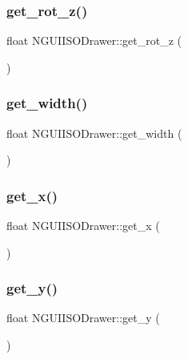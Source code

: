 \subsubsection{\texorpdfstring{get\+\_\+rot\+\_\+z()}{get\_rot\_z()}}
{\footnotesize\ttfamily float N\+G\+U\+I\+I\+S\+O\+Drawer\+::get\+\_\+rot\+\_\+z (\begin{DoxyParamCaption}{ }\end{DoxyParamCaption})}

\hypertarget{class_n_g_u_i_i_s_o_drawer_ae09717ad8caa02443d28f7a5dcaed492}{}\label{class_n_g_u_i_i_s_o_drawer_ae09717ad8caa02443d28f7a5dcaed492} 
\subsubsection{\texorpdfstring{get\+\_\+width()}{get\_width()}}
{\footnotesize\ttfamily float N\+G\+U\+I\+I\+S\+O\+Drawer\+::get\+\_\+width (\begin{DoxyParamCaption}{ }\end{DoxyParamCaption})}

\hypertarget{class_n_g_u_i_i_s_o_drawer_abd25689a8e297fe4d5f2fb865e488b86}{}\label{class_n_g_u_i_i_s_o_drawer_abd25689a8e297fe4d5f2fb865e488b86} 
\subsubsection{\texorpdfstring{get\+\_\+x()}{get\_x()}}
{\footnotesize\ttfamily float N\+G\+U\+I\+I\+S\+O\+Drawer\+::get\+\_\+x (\begin{DoxyParamCaption}{ }\end{DoxyParamCaption})}

\hypertarget{class_n_g_u_i_i_s_o_drawer_a9e42b97958cd6c0c5d6dd87d7a0cab00}{}\label{class_n_g_u_i_i_s_o_drawer_a9e42b97958cd6c0c5d6dd87d7a0cab00} 
\subsubsection{\texorpdfstring{get\+\_\+y()}{get\_y()}}
{\footnotesize\ttfamily float N\+G\+U\+I\+I\+S\+O\+Drawer\+::get\+\_\+y (\begin{DoxyParamCaption}{ }\end{DoxyParamCaption})}

